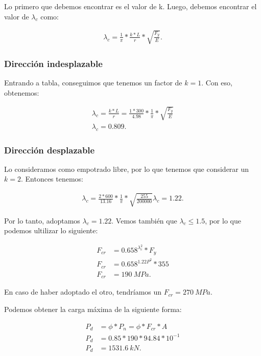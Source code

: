 \documentclass[../main.tex]{subfiles}
\begin{document}
Lo primero que debemos encontrar es el valor de k. Luego, debemos encontrar el
valor de $\lambda_c$ como:

\begin{align*}
  \lambda_c = \frac{1}{\pi}*\frac{k*L}{r}*\sqrt{\frac{F_y}{E}} 
.\end{align*}


\subsubsection{Dirección indesplazable}

Entrando a tabla, conseguimos que tenemos un factor de $k=1$. Con eso, obtenemos:

\begin{align*}
  \lambda_c = \frac{k*L}{r} = \frac{1*300}{4.98} * \frac{1}{\pi} * \sqrt{\frac{F_y}{E}}\\
  \lambda_c = 0.809
.\end{align*}

\subsubsection{Dirección desplazable}

Lo consideramos como empotrado libre, por lo que tenemos que considerar un $k=2$.
Entonces tenemos:

 \begin{align*}
  \lambda_c = \frac{2*600}{13.16} * \frac{1}{\pi} * \sqrt{\frac{255}{200000}} 
  \lambda_c = 1.22
.\end{align*}

Por lo tanto, adoptamos  $\lambda_c = 1.22$. Vemos también que  $\lambda_c \leq 1.5$,
por lo que podemos ultilizar lo siguiente:

\begin{align*}
  F_{cr} &= 0.658^{\lambda_c^{2}} * F_y \\
  F_{cr} &= 0.658^{1.22P^{2}} * 355 \\
  F_{cr} &= \SI{190}{MPa}
.\end{align*}

En caso de haber adoptado el otro, tendríamos un $F_{cr}= \SI{270}{MPa}$.

Podemos obtener la carga máxima de la siguiente forma:

\begin{align*}
  P_d &= \phi*P_n = \phi*F_{cr} * A \\
  P_d &= 0.85 * 190 * 94.84 * 10^{-1} \\
  P_d &= \SI{1531.6}{kN}
.\end{align*}
\end{document}
